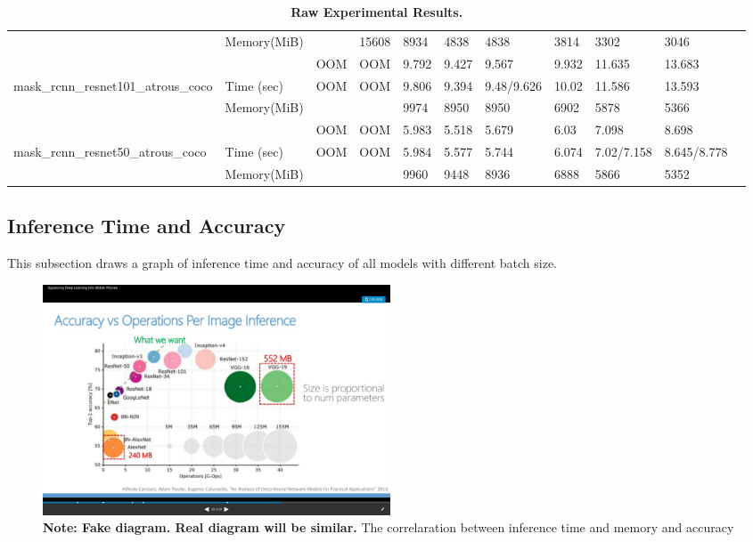 \documentclass[conference]{IEEEtran}
\begin{document}
\begin{table}[]
{\begin{tabular}{lllllllllll}
                                                                & Memory(MiB)   &                     & 15608              & 8934              & 4838              & 4838             & 3814   & 3302              & 3046        &          \\
                                                                &               & OOM                 & OOM                & 9.792             & 9.427             & 9.567            & 9.932  & 11.635            & 13.683      &          \\
mask\_rcnn\_resnet101\_atrous\_coco                             & Time (sec)    & OOM                 & OOM                & 9.806             & 9.394             & 9.48/9.626       & 10.02  & 11.586            & 13.593      &          \\
                                                                & Memory(MiB)   &                     &                    & 9974              & 8950              & 8950             & 6902   & 5878              & 5366        &          \\
                                                                &               & OOM                 & OOM                & 5.983             & 5.518             & 5.679            & 6.03   & 7.098             & 8.698       &          \\
mask\_rcnn\_resnet50\_atrous\_coco                              & Time (sec)    & OOM                 & OOM                & 5.984             & 5.577             & 5.744            & 6.074  & 7.02/7.158        & 8.645/8.778 &          \\
                                                                & Memory(MiB)   &                     &                    & 9960              & 9448              & 8936             & 6888   & 5866              & 5352        &         
\end{tabular}%
}
\caption{\textbf{Raw Experimental Results.}}
\label{table:raw-results}
\end{table}

\subsection{Inference Time and Accuracy}
This subsection draws a graph of inference time and accuracy of all models with different batch size.

\begin{figure}[htpb]
	  \centering
	  \includegraphics[width=0.5\textwidth]{time-memory-accuracy}
	  \caption{\textbf{Note: Fake diagram. Real diagram will be similar.} The correlaration between inference time and memory and accuracy}
	  \label{fig:time-memory-accuracy}
\end{figure}
\end{document}
